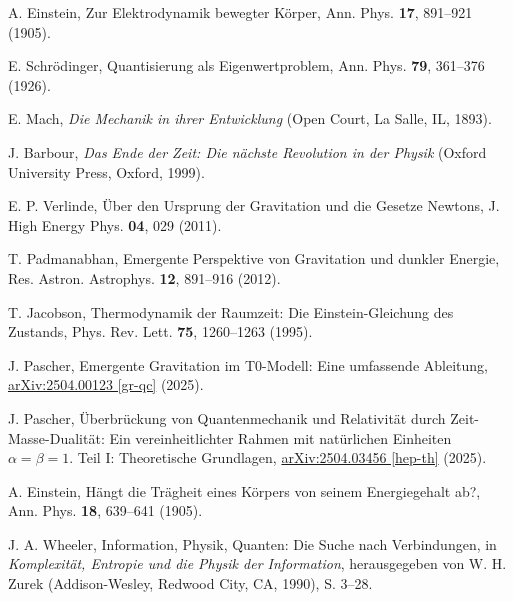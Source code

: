 \documentclass[twocolumn,aps,prl]{revtex4-2}
\begin{document}
{{{{{{{{{{{{{{{{\begin{thebibliography}{99}
																				 A. Einstein, Zur Elektrodynamik bewegter Körper, Ann. Phys. \textbf{17}, 891--921 (1905).
																				
																				 E. Schrödinger, Quantisierung als Eigenwertproblem, Ann. Phys. \textbf{79}, 361--376 (1926).
																				
																				 E. Mach, \textit{Die Mechanik in ihrer Entwicklung} (Open Court, La Salle, IL, 1893).
																				
																				 J. Barbour, \textit{Das Ende der Zeit: Die nächste Revolution in der Physik} (Oxford University Press, Oxford, 1999).
																				
																				 E. P. Verlinde, Über den Ursprung der Gravitation und die Gesetze Newtons, J. High Energy Phys. \textbf{04}, 029 (2011).
																				
																				 T. Padmanabhan, Emergente Perspektive von Gravitation und dunkler Energie, Res. Astron. Astrophys. \textbf{12}, 891--916 (2012).
																				
																				 T. Jacobson, Thermodynamik der Raumzeit: Die Einstein-Gleichung des Zustands, Phys. Rev. Lett. \textbf{75}, 1260--1263 (1995).
																				
																				 J. Pascher, Emergente Gravitation im T0-Modell: Eine umfassende Ableitung, \href{https://github.com/jpascher/T0-Time-Mass-Duality/tree/main/2/pdf/Deutsch/EmergentGravT0.pdf}{arXiv:2504.00123 [gr-qc]} (2025).
																				
																				 J. Pascher, Überbrückung von Quantenmechanik und Relativität durch Zeit-Masse-Dualität: Ein vereinheitlichter Rahmen mit natürlichen Einheiten \(\alpha = \beta = 1\). Teil I: Theoretische Grundlagen, \href{https://github.com/jpascher/T0-Time-Mass-Duality/tree/main/2/pdf/Deutsch/Teil1Theorie.pdf}{arXiv:2504.03456 [hep-th]} (2025).
																				
																				 A. Einstein, Hängt die Trägheit eines Körpers von seinem Energiegehalt ab?, Ann. Phys. \textbf{18}, 639--641 (1905).
																				
																				 J. A. Wheeler, Information, Physik, Quanten: Die Suche nach Verbindungen, in \textit{Komplexität, Entropie und die Physik der Information}, herausgegeben von W. H. Zurek (Addison-Wesley, Redwood City, CA, 1990), S. 3--28.
																				

\end{thebibliography}}}}}}}}}}}}}}}}}
\end{document}
